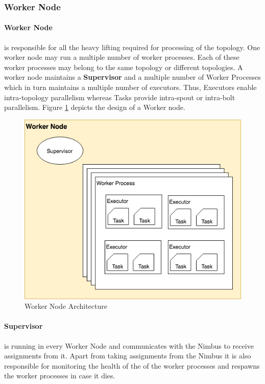 \documentclass[runningheads,a4paper]{llncs}[2015/06/24]
\begin{document}
\subsubsection{Worker Node}
\paragraph{Worker Node} is responsible for all the heavy lifting required for processing of the topology. One worker node may run a multiple number of worker processes. Each of these worker processes may belong to the same topology or different topologies. A worker node maintains a \textbf{Supervisor} and a multiple number of Worker Processes which in turn maintains a multiple number of executors. Thus, Executors enable intra-topology parallelism whereas Tasks provide intra-spout or intra-bolt parallelism. Figure \ref{fig:workerarch} depicts the design of a Worker node.\cite{stormtwitter}

\begin{figure}
  \begin{center}
    \includegraphics[width=.7\textwidth]{worker.png}
    \caption{Worker Node Architecture}
    \label{fig:workerarch}
   \end{center}
\end{figure}

\paragraph{Supervisor} is running in every Worker Node and communicates with the Nimbus to receive assignments from it. Apart from taking assignments from the Nimbus it is also responsible for monitoring the health of the of the worker processes and respawns the worker processes in case it dies.
\end{document}
